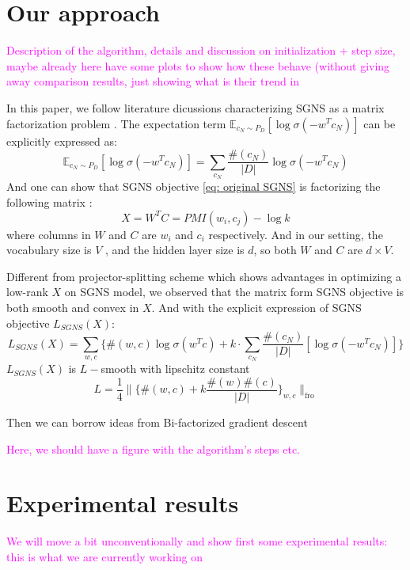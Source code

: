 \documentclass[letterpaper]{article} %
\begin{document}
\section{Our approach}
\textcolor{magenta}{Description of the algorithm, details and discussion on initialization + step size, maybe already here have some plots to show how these behave (without giving away comparison results, just showing what is their trend in}

In this paper, we follow literature dicussions characterizing SGNS as a matrix factorization problem \cite{levy2014neural}\cite{levy2015improving}. The expectation term $\mathbb{E}_{c_N\sim P_D}[\log \sigma(-w^Tc_N)]$ can be explicitly expressed as:
\begin{equation}
	\mathbb{E}_{c_N\sim P_D}[\log \sigma(-w^Tc_N)]=\sum_{c_N}\frac{\#(c_N)}{|D|}\log{\sigma(-w^Tc_N)}
\end{equation}
And one can show that SGNS objective \ref{eq: original SGNS} is factorizing the following matrix \cite{levy2014neural}:
\begin{equation}
	X=W^TC= PMI(w_i, c_j)-\log k \label{eq: SPPMI}
\end{equation}
where columns in $W$ and $C$ are $w_i$ and $c_i$ respectively. And in our setting, the vocabulary size is $V$ , and the hidden layer size is $d$, so both $W$ and $C$ are $d\times V$.

Different from projector-splitting scheme\cite{fonarev2017riemannian} which shows advantages in optimizing a low-rank $X$ on SGNS model, we observed that the matrix form SGNS objective is both smooth and convex in $X$. And with the explicit expression of SGNS objective $L_{SGNS}(X)$:
\begin{equation}
	L_{SGNS}(X)=\sum_{w,c}\{\#(w,c)\log\sigma(w^Tc)+k\cdot\sum_{c_N}\frac{\#(c_N)}{|D|}[\log \sigma(-w^Tc_N)]\}
\end{equation}
$L_{SGNS}(X)$ is $L-$smooth with lipschitz constant $$L=\frac{1}{4}\|\{\#(w,c)+k\frac{\#(w)\#(c)}{|D|}\}_{w,c}\|_\text{fro}$$

Then we can borrow ideas from Bi-factorized gradient descent\cite{park2016finding}



\textcolor{magenta}{Here, we should have a figure with the algorithm's steps etc.}

\section{Experimental results}
\textcolor{magenta}{We will move a bit unconventionally and show first some experimental results: this is what we are currently working on}
\end{document}
